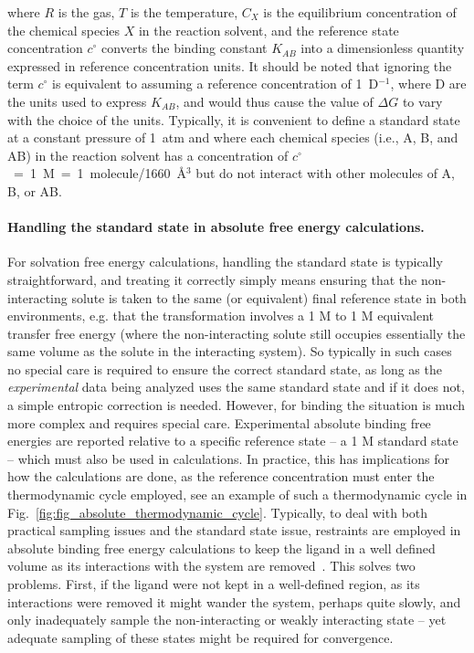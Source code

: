 \documentclass[9pt,bestpractices]{livecoms}
\begin{document}
where $R$ is the gas, $T$ is the temperature, $C_X$ is the equilibrium concentration of the chemical species $X$ in the reaction solvent, and the reference state concentration $c^{\circ}$ converts the binding constant $K_{AB}$ into a dimensionless quantity expressed in reference concentration units.
It should be noted that ignoring the term $c^{\circ}$ is equivalent to assuming a reference concentration of 1~D$^{-1}$, where D are the units used to express $K_{AB}$, and would thus cause the value of $\Delta G$ to vary with the choice of the units.
Typically, it is convenient to define a standard state at a constant pressure of 1~atm and where each chemical species (i.e., A, B, and AB) in the reaction solvent has a concentration of $c^{\circ}$~=~1~M~=~1~molecule/1660~\r{A}$^3$ but do not interact with other molecules of A, B, or AB.
%
\paragraph{Handling the standard state in absolute free energy calculations.}
For solvation free energy calculations, handling the standard state is typically straightforward, and treating it correctly simply means ensuring that the non-interacting solute is taken to the same (or equivalent) final reference state in both environments, e.g. that the transformation involves a 1 M to 1 M equivalent transfer free energy (where the non-interacting solute still occupies essentially the same volume as the solute in the interacting system).
So typically in such cases no special care is required to ensure the correct standard state, as long as the \emph{experimental} data being analyzed uses the same standard state and if it does not, a simple entropic correction is needed.
%
However, for binding the situation is much more complex and requires special care.
Experimental absolute binding free energies are reported relative to a specific reference state -- a 1 M standard state -- which must also be used in calculations.
In practice, this has implications for how the calculations are done, as the reference concentration must enter the thermodynamic cycle employed, see an example of such a thermodynamic cycle in Fig.~\ref{fig:fig_absolute_thermodynamic_cycle}.
%
Typically, to deal with both practical sampling issues and the standard state issue, restraints are employed in absolute binding free energy calculations to keep the ligand in a well defined volume as its interactions with the system are removed~\cite{gilson1997statisticalthermodynamic}.
This solves two problems.
First, if the ligand were not kept in a well-defined region, as its interactions were removed it might wander the system, perhaps quite slowly, and only inadequately sample the non-interacting or weakly interacting state -- yet adequate sampling of these states might be required for convergence.
\end{document}
